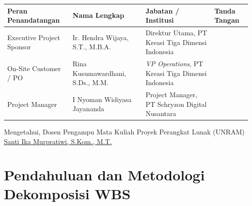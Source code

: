 \documentclass[11pt,a4paper]{article}
\newcommand{\thdr}[1]{\centering\arraybackslash\textbf{#1}}
\renewcommand{\arraystretch}{1.24}
\begin{document}
\vspace{8pt}
\vspace{3pt}

\noindent
{\renewcommand{\arraystretch}{1.05}\footnotesize
\begin{tabularx}{\textwidth}{| L{3.8cm} | L{4.2cm} | Y | C{2.5cm} |}
\hline
{} \thdr{Peran Penandatangan} & \thdr{Nama Lengkap} & \thdr{Jabatan / Institusi} & \thdr{Tanda Tangan} \\
\hline
Executive Project Sponsor & Ir. Hendra Wijaya, S.T., M.B.A. & Direktur Utama, PT Kreasi Tiga Dimensi Indonesia & \vspace{0.38cm} \\
\hline
On-Site Customer / PO & Rina Kusumawardhani, S.Ds., M.M. & \textit{VP Operations}, PT Kreasi Tiga Dimensi Indonesia & \vspace{0.38cm} \\
\hline
Project Manager & I Nyoman Widiyasa Jayananda & Project Manager, PT Schryzon Digital Nusantara & \vspace{0.38cm} \\
\hline
\end{tabularx}}

\vspace{4pt}
\begin{center}
    {\footnotesize Mengetahui, Dosen Pengampu Mata Kuliah Proyek Perangkat Lunak (UNRAM) \\[0.36cm]
    \underline{Santi Ika Murpratiwi, S.Kom., M.T.}}
\end{center}

\clearpage

\pagestyle{fancy}
\tableofcontents
\vspace{8pt}
\listoffigures
\vspace{8pt}
\listoftables

\clearpage

\section{Pendahuluan dan Metodologi Dekomposisi WBS}
\end{document}
